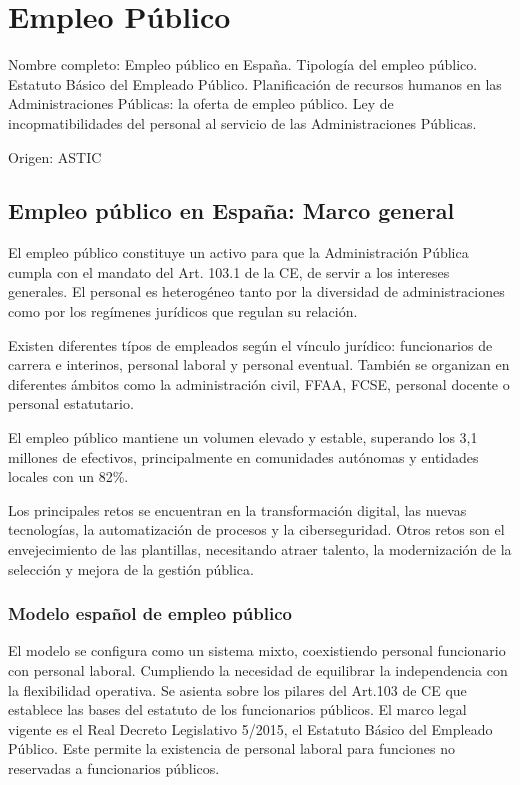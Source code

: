 \setcounter{section}{23}
\section{Empleo Público}

Nombre completo: Empleo público en España. Tipología del empleo público. Estatuto Básico del Empleado Público. Planificación de recursos humanos en las Administraciones Públicas: la oferta de empleo público. Ley de incopmatibilidades del personal al servicio de las Administraciones Públicas.

Origen: ASTIC

\localtableofcontents

\subsection{Empleo público en España: Marco general} %
    El empleo público constituye un activo para que la Administración Pública cumpla con el mandato del Art. 103.1 de la CE, de servir a los intereses generales. El personal es heterogéneo tanto por la diversidad de administraciones como por los regímenes jurídicos que regulan su relación.

    Existen diferentes típos de empleados según el vínculo jurídico: funcionarios de carrera e interinos, personal laboral y personal eventual. También se organizan en diferentes ámbitos como la administración civil, FFAA, FCSE, personal docente o personal estatutario.

    El empleo público mantiene un volumen elevado y estable, superando los 3,1 millones de efectivos, principalmente en comunidades autónomas y entidades locales con un 82\%.

    Los principales retos se encuentran en la transformación digital, las nuevas tecnologías, la automatización de procesos y la ciberseguridad. Otros retos son el envejecimiento de las plantillas, necesitando atraer talento, la modernización de la selección y mejora de la gestión pública.

    \subsubsection{Modelo español de empleo público} %
        El modelo se configura como un sistema mixto, coexistiendo personal funcionario con personal laboral. Cumpliendo la necesidad de equilibrar la independencia con la flexibilidad operativa. Se asienta sobre los pilares del Art.103 de CE que establece las bases del estatuto de los funcionarios públicos. El marco legal vigente es el Real Decreto Legislativo 5/2015, el Estatuto Básico del Empleado Público. Este permite la existencia de personal laboral para funciones no reservadas a funcionarios públicos.

